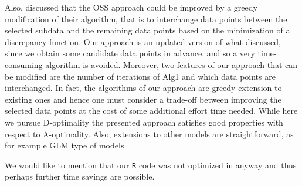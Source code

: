\documentclass[12pt]{article}
\theoremstyle{definition}
\begin{document}
	Also, \cite{wang2021oss} discussed that the OSS approach could be improved by a greedy modification of their algorithm, that is to interchange data points between the selected subdata and the remaining data points based on the minimization of a discrepancy function. Our approach is an updated version of what \cite{wang2021oss} discussed, since we obtain some candidate data points in advance, and so a very time-consuming algorithm is avoided. Moreover, two features of our approach that can be modified are the number of iterations of Alg1 and which data points are interchanged. In fact, the algorithms of our approach are greedy extension to existing ones and hence one must consider a trade-off between improving the selected data points at the cost of some additional effort time needed. While here we pursue D-optimality the presented approach satisfies good properties with respect to A-optimality. Also, extensions to other models are straightforward, as for example GLM type of models.
	
	We would like to mention that our \texttt{R} code was not optimized in anyway and thus perhaps further time savings are possible. 
	
	
	
\end{document}
